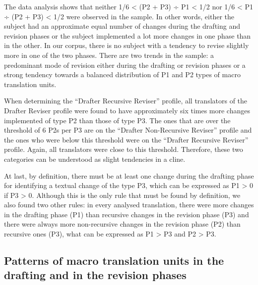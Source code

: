 \documentclass[output=paper]{LSP/langsci}
\begin{document}
The data analysis shows that neither 1/6 {\textless} (P2 + P3) ÷ P1 {\textless} 1/2 nor 1/6 {\textless} P1 ÷ (P2 + P3) {\textless} 1/2 were observed in the sample. In other words, either the subject had an approximate equal number of changes during the drafting and revision phases or the subject implemented a lot more changes in one phase than in the other. In our corpus, there is no subject with a tendency to revise slightly more in one of the two phases. There are two trends in the sample: a predominant mode of revision either during the drafting or revision phases or a strong tendency towards a balanced distribution of  P1 and P2 types of macro translation units.

When determining the ``Drafter Recursive Reviser'' profile, all translators of the Drafter Reviser profile were found to have approximately six times more changes implemented of type P2 than those of type P3. The ones that are over the threshold of 6 P2s per P3 are on the ``Drafter Non-Recursive Reviser'' profile and the ones who were below this threshold were on the ``Drafter Recursive Reviser'' profile. Again, all translators were close to this threshold. Therefore, these two categories can be understood as slight tendencies in a cline.

At last, by definition, there must be at least one change during the drafting phase for identifying a textual change of the type P3, which can be expressed as P1 {\textgreater} 0 if P3 {\textgreater} 0. Although this is the only rule that must be found by definition, we also found two other rules: in every analysed translation, there were more changes in the drafting phase (P1) than recursive changes in the revision phase (P3) and there were always more non-recursive changes in the revision phase (P2) than recursive ones (P3), what can be expressed as P1 {\textgreater} P3 and P2 {\textgreater} P3.

\subsection{Patterns of macro translation units in the drafting and in the revision phases}\label{sec:alves:4.3}
\end{document}
